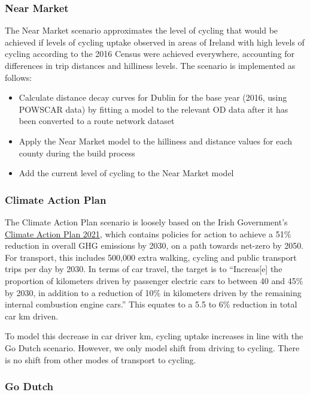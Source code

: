 \documentclass[
  super,
  preprint,
  3p]{elsarticle}
\providecommand{\tightlist}{%
  \setlength{\itemsep}{0pt}\setlength{\parskip}{0pt}}\usepackage{longtable,booktabs,array}
\begin{document}
\subsubsection{Near Market}\label{near-market}

The Near Market scenario approximates the level of cycling that would be
achieved if levels of cycling uptake observed in areas of Ireland with
high levels of cycling according to the 2016 Census were achieved
everywhere, accounting for differences in trip distances and hilliness
levels. The scenario is implemented as follows:

\begin{itemize}
\tightlist
\item
  Calculate distance decay curves for Dublin for the base year (2016,
  using POWSCAR data) by fitting a model to the relevant OD data after
  it has been converted to a route network dataset
\item
  Apply the Near Market model to the hilliness and distance values for
  each county during the build process
\item
  Add the current level of cycling to the Near Market model
\end{itemize}

\subsubsection{Climate Action Plan}\label{climate-action-plan}

The Climate Action Plan scenario is loosely based on the Irish
Government's
\href{https://www.gov.ie/en/publication/6223e-climate-action-plan-2021/}{Climate
Action Plan 2021}, which contains policies for action to achieve a 51\%
reduction in overall GHG emissions by 2030, on a path towards net-zero
by 2050. For transport, this includes 500,000 extra walking, cycling and
public transport trips per day by 2030. In terms of car travel, the
target is to ``Increas{[}e{]} the proportion of kilometers driven by
passenger electric cars to between 40 and 45\% by 2030, in addition to a
reduction of 10\% in kilometers driven by the remaining internal
combustion engine cars.'' This equates to a 5.5 to 6\% reduction in
total car km driven.

To model this decrease in car driver km, cycling uptake increases in
line with the Go Dutch scenario. However, we only model shift from
driving to cycling. There is no shift from other modes of transport to
cycling.

\subsubsection{Go Dutch}\label{go-dutch}
\end{document}
